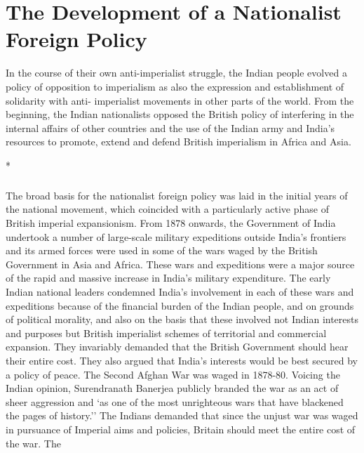 \chapter{The Development of a Nationalist Foreign Policy}



In the course of their own anti-imperialist struggle, the Indian people evolved a policy of opposition to imperialism as also the expression and establishment of solidarity with anti- imperialist movements in other parts of the world. From the beginning, the Indian nationalists opposed the British policy of interfering in the internal affairs of other countries and the use of the Indian army and India's resources to promote, extend and defend British imperialism in Africa and Asia.

\begin{center}*\end{center}

\paragraph*{}


The broad basis for the nationalist foreign policy was laid in the initial years of the national movement, which coincided with a particularly active phase of British imperial expansionism. From 1878 onwards, the Government of India undertook a number of large-scale military expeditions outside India's frontiers and its armed forces were used in some of the wars waged by the British Government in Asia and Africa. These wars and expeditions were a major source of the rapid and massive increase in India's military expenditure. The early Indian national leaders condemned India's involvement in each of these wars and expeditions because of the financial burden of the Indian people, and on grounds of political morality, and also on the basis that these involved not Indian interests and purposes but British imperialist schemes of territorial and commercial expansion. They invariably demanded that the British Government should hear their entire cost. They also argued that India's interests would be best secured by a policy of peace. The Second Afghan War was waged in 1878-80. Voicing the Indian opinion, Surendranath Banerjea publicly branded the war as an act of sheer aggression and `as one of the most unrighteous wars that have blackened the pages of history.'' The Indians demanded that since the unjust war was waged in pursuance of Imperial aims and policies, Britain should meet the entire cost of the war. The 

